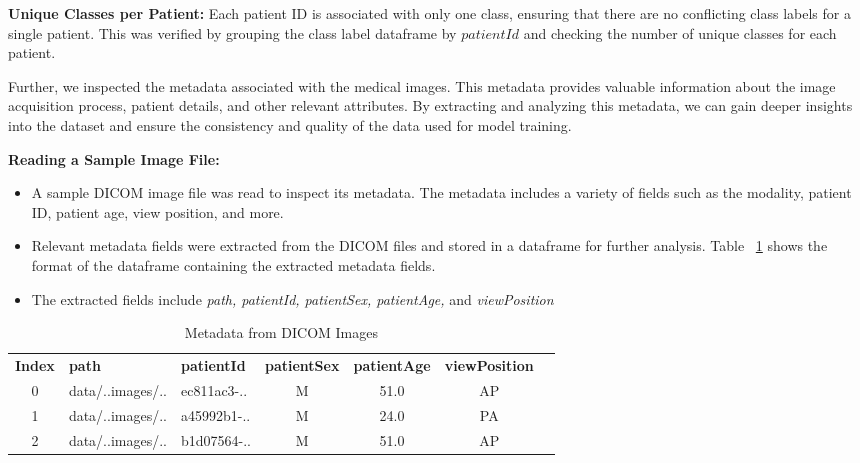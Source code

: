 \textbf{Unique Classes per Patient:} Each patient ID is associated with only one class, ensuring that there are no conflicting class labels for a single patient. This was verified by grouping the class label dataframe by $patientId$ and checking the number of unique classes for each patient.

Further, we inspected the metadata associated with the medical images. This metadata provides valuable information about the image acquisition process, patient details, and other relevant attributes. By extracting and analyzing this metadata, we can gain deeper insights into the dataset and ensure the consistency and quality of the data used for model training.

\textbf{Reading a Sample Image File:}
\begin{itemize}
    \item A sample DICOM image file was read to inspect its metadata. The metadata includes a variety of fields such as the modality, patient ID, patient age, view position, and more.
    \item Relevant metadata fields were extracted from the DICOM files and stored in a dataframe for further analysis. Table ~\ref{tab:cha-2 table4} shows the format of the dataframe containing the extracted metadata fields.
    \item The extracted fields include \emph{path, patientId, patientSex, patientAge,} and \emph{viewPosition}

\end{itemize}

\begin{table}[h!]
    \centering
    \caption{Metadata from DICOM Images}
    \label{tab:cha-2 table4}
    \begin{adjustbox}{max width=\textwidth}
        \begin{tabularx}{\textwidth}{c|X|X|c|c|c|c}
            \rowcolor{gray!20}
            \textbf{Index} & \textbf{path}    & \textbf{patientId} & \textbf{patientSex} & \textbf{patientAge} & \textbf{viewPosition} \\
            0              & data/..images/.. & ec811ac3-..        & M                   & 51.0                & AP                    \\
            1              & data/..images/.. & a45992b1-..        & M                   & 24.0                & PA                    \\
            2              & data/..images/.. & b1d07564-..        & M                   & 51.0                & AP                    \\
        \end{tabularx}
    \end{adjustbox}
\end{table}

